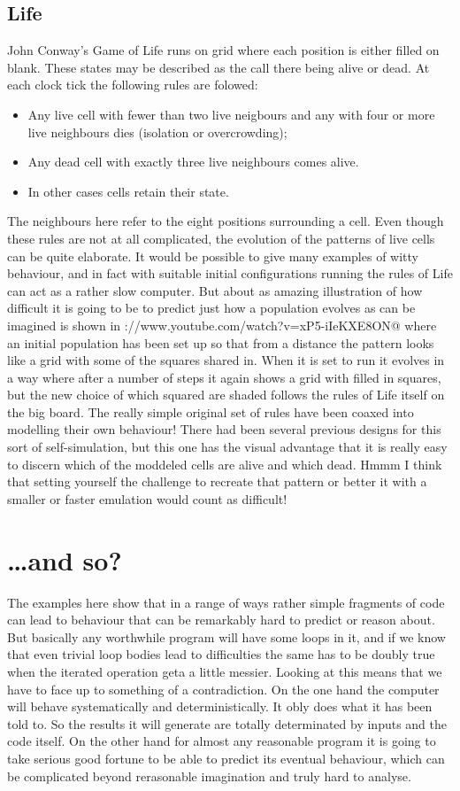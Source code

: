 \subsection{Life}
John Conway's Game of Life\cite{life} runs on grid where each position
is either filled on blank. These states may be described as the
call there being alive or dead. At each clock tick the following rules
are folowed:
\begin{itemize}
\item Any live cell with fewer than two live neigbours and any with
four or more live neighbours dies (isolation or overcrowding);
\item Any dead cell with exactly three live neighbours comes alive.
\item In other cases cells retain their state.
\end{itemize}
The neighbours here refer to the eight positions surrounding a cell. Even
though these rules are not at all complicated, the evolution of the
patterns of live cells can be quite elaborate. It would be possible to
give many examples of witty behaviour, and in fact with suitable initial
configurations running the rules of Life can act as a rather slow
computer. But about as amazing illustration of how difficult it is
going to be to predict just how a population evolves as can be
imagined is shown in
\verb@https://www.youtube.com/watch?v=xP5-iIeKXE8ON@ where an
initial population has been set up so that from a distance the
pattern looks like a grid with some of the squares shared in.
When it is set to run it evolves in a way where after a number of steps
it again shows a grid with filled in squares, but the new choice of
which squared are shaded follows the rules of Life itself on the
big board. The really simple original set of rules have been coaxed
into modelling their own behaviour! There had been several previous
designs for this sort of self-simulation, but this one has the visual
advantage that it is really easy to discern which of the moddeled
cells are alive and which dead. Hmmm I think that setting yourself the
challenge to recreate that pattern or better it with a smaller or
faster emulation would count as difficult!
\section{\ldots and so?}
The examples here show that in a range of ways rather simple fragments
of code can lead to behaviour that can be remarkably hard to predict or
reason about. But basically any worthwhile program will have some loops in
it, and if we know that even trivial loop bodies lead to difficulties the
same has to be doubly true when the iterated operation geta a little
messier. Looking at this means that we have to face up to something of
a contradiction. On the one hand the computer will behave systematically and
deterministically. It obly does what it has been told to. So the results
it will generate are totally determinated by inputs and the code itself.
On the other hand for almost any reasonable program it is going to take
serious good fortune to be able to predict its eventual behaviour,
which can be complicated beyond rerasonable imagination and truly hard to
analyse.
